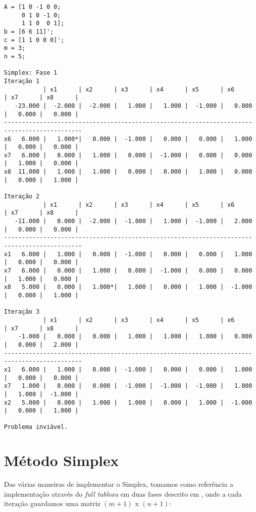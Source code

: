 \documentclass[brazil,times]{abnt}
\begin{document}
{\scriptsize \begin{verbatim}
A = [1 0 -1 0 0;
	 0 1 0 -1 0;
	 1 1 0  0 1];
b = [6 6 11]';
c = [1 1 0 0 0]';
m = 3;
n = 5;

Simplex: Fase 1
Iteração 1
           | x1      | x2      | x3      | x4      | x5      | x6      | x7      | x8      |
   -23.000 |  -2.000 |  -2.000 |   1.000 |   1.000 |  -1.000 |   0.000 |   0.000 |   0.000 |
--------------------------------------------------------------------------------------------
x6   6.000 |   1.000*|   0.000 |  -1.000 |   0.000 |   0.000 |   1.000 |   0.000 |   0.000 |
x7   6.000 |   0.000 |   1.000 |   0.000 |  -1.000 |   0.000 |   0.000 |   1.000 |   0.000 |
x8  11.000 |   1.000 |   1.000 |   0.000 |   0.000 |   1.000 |   0.000 |   0.000 |   1.000 |

Iteração 2
           | x1      | x2      | x3      | x4      | x5      | x6      | x7      | x8      |
   -11.000 |   0.000 |  -2.000 |  -1.000 |   1.000 |  -1.000 |   2.000 |   0.000 |   0.000 |
--------------------------------------------------------------------------------------------
x1   6.000 |   1.000 |   0.000 |  -1.000 |   0.000 |   0.000 |   1.000 |   0.000 |   0.000 |
x7   6.000 |   0.000 |   1.000 |   0.000 |  -1.000 |   0.000 |   0.000 |   1.000 |   0.000 |
x8   5.000 |   0.000 |   1.000*|   1.000 |   0.000 |   1.000 |  -1.000 |   0.000 |   1.000 |

Iteração 3
           | x1      | x2      | x3      | x4      | x5      | x6      | x7      | x8      |
    -1.000 |   0.000 |   0.000 |   1.000 |   1.000 |   1.000 |   0.000 |   0.000 |   2.000 |
--------------------------------------------------------------------------------------------
x1   6.000 |   1.000 |   0.000 |  -1.000 |   0.000 |   0.000 |   1.000 |   0.000 |   0.000 |
x7   1.000 |   0.000 |   0.000 |  -1.000 |  -1.000 |  -1.000 |   1.000 |   1.000 |  -1.000 |
x2   5.000 |   0.000 |   1.000 |   1.000 |   0.000 |   1.000 |  -1.000 |   0.000 |   1.000 |

Problema inviável.
\end{verbatim} }

\section*{Método Simplex}
Das várias maneiras de implementar o Simplex, tomamos como referência a implementação através do \emph{full tableau} em duas fases descrito em \cite{Bertsimas:1997:ILO:548834}, onde a cada iteração guardamos uma matriz $(m + 1)$ x $(n + 1)$:
\end{document}
